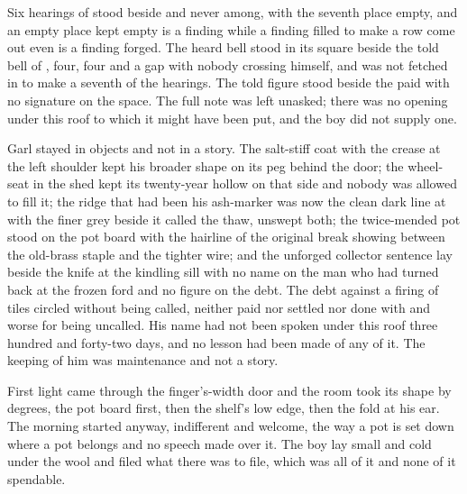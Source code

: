 Six hearings of  stood beside and never among, with the seventh place empty, and an empty place kept empty is a finding while a finding filled to make a row come out even is a finding forged. The heard bell stood in its square beside the told bell of , four, four and a gap with nobody crossing himself, and was not fetched in to make a seventh of the hearings. The told figure stood beside the paid with no signature on the space. The full note was left unasked; there was no opening under this roof to which it might have been put, and the boy did not supply one.

Garl stayed in objects and not in a story. The salt-stiff coat with the crease at the left shoulder kept his broader shape on its peg behind the door; the wheel-seat in the shed kept its twenty-year hollow on that side and nobody was allowed to fill it; the ridge that had been his ash-marker was now the clean dark line at  with the finer grey beside it called the thaw, unswept both; the twice-mended pot stood on the pot board with the hairline of the original break showing between the old-brass staple and the tighter wire; and the unforged collector sentence lay beside the knife at the kindling sill with no name on the man who had turned back at the frozen ford and no figure on the debt. The debt against a firing of tiles circled without being called, neither paid nor settled nor done with and worse for being uncalled. His name had not been spoken under this roof three hundred and forty-two days, and no lesson had been made of any of it. The keeping of him was maintenance and not a story.

First light came through the finger's-width door and the room took its shape by degrees, the pot board first, then the shelf's low edge, then the fold at his ear. The morning started anyway, indifferent and welcome, the way a pot is set down where a pot belongs and no speech made over it. The boy lay small and cold under the wool and filed what there was to file, which was all of it and none of it spendable.

